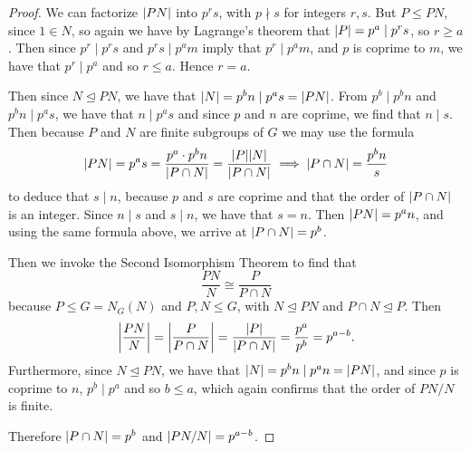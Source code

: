 \documentclass[11pt]{article}
\begin{document}
\begin{enumerate}
\begin{proof}
        We can factorize $\abs{PN}$ into $p^r s$, with $p\nmid s$ for integers $r,s$. But $P\leq PN$, since $1\in N$, so again we have by Lagrange's theorem that $\abs{P} = p^a \mid  p^rs$, so $r\geq a$. Then since $p^r\mid p^rs$ and $p^rs\mid p^am$ imply that $p^r\mid p^am$, and $p$ is coprime to $m$, we have that $p^r\mid p^a$ and so $r\leq a$. Hence $r=a$.

        Then since $N\unlhd PN$, we have that $\abs{N} = p^bn \mid p^as = \abs{PN}$. From $p^b\mid p^bn$ and $p^bn \mid p^as$, we have that $n \mid p^as$ and since $p$ and $n$ are coprime, we find that $n\mid s$. Then because $P$ and $N$ are finite subgroups of $G$ we may use the formula
        \[\abs{PN} = p^as = \frac{p^a \cdot p^bn}{\abs{P\cap N}} = \frac{\abs{P}\abs{N}}{\abs{P\cap N}}\implies \abs{P\cap N} = \frac{p^bn}{s}\] to deduce that $s\mid n$, because $p$ and $s$ are coprime and that the order of $\abs{P\cap N}$ is an integer. Since $n\mid s$ and $s\mid n$, we have that $s = n$. Then $\abs{PN} = p^an$, and using the same formula above, we arrive at $\abs{P\cap N} = p^b$.

        Then we invoke the Second Isomorphism Theorem to find that \[\frac{PN}{N}\cong \frac{P}{P\cap N}\] because $P\leq G = N_G(N)$ and $P,N\leq G$, with $N\unlhd PN$ and $P\cap N\unlhd P$. Then \[\abs{\frac{PN}{N}} = \abs{\frac{P}{P\cap N}} = \frac{\abs{P}}{\abs{P\cap N}} = \frac{p^a}{p^b} = p^{a-b}.\] Furthermore, since $N\unlhd PN$, we have that $\abs{N} = p^bn\mid p^an = \abs{PN}$, and since $p$ is coprime to $n$, $p^b\mid p^a$ and so $b\leq a$, which again confirms that the order of $PN/N$ is finite.

        Therefore $\abs{P\cap N} = p^b$ and $\abs{PN/N} = p^{a-b}$.
    \end{proof}
\end{enumerate}
\end{document}

